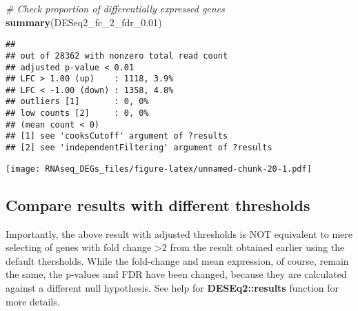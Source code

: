 \documentclass[]{book}
\newenvironment{Shaded}{\begin{snugshade}}{\end{snugshade}}
\newcommand{\KeywordTok}[1]{\textcolor[rgb]{0.13,0.29,0.53}{\textbf{#1}}}
\newcommand{\DataTypeTok}[1]{\textcolor[rgb]{0.13,0.29,0.53}{#1}}
\newcommand{\DecValTok}[1]{\textcolor[rgb]{0.00,0.00,0.81}{#1}}
\newcommand{\FloatTok}[1]{\textcolor[rgb]{0.00,0.00,0.81}{#1}}
\newcommand{\StringTok}[1]{\textcolor[rgb]{0.31,0.60,0.02}{#1}}
\newcommand{\CommentTok}[1]{\textcolor[rgb]{0.56,0.35,0.01}{\textit{#1}}}
\newcommand{\OperatorTok}[1]{\textcolor[rgb]{0.81,0.36,0.00}{\textbf{#1}}}
\newcommand{\NormalTok}[1]{#1}
\begin{document}
\begin{Shaded}
\begin{Highlighting}[]
\CommentTok{# Check proportion of differentially expressed genes}
\KeywordTok{summary}\NormalTok{(DESeq2_fc_2_fdr_}\FloatTok{0.01}\NormalTok{)}
\end{Highlighting}
\end{Shaded}

\begin{verbatim}
## 
## out of 28362 with nonzero total read count
## adjusted p-value < 0.01
## LFC > 1.00 (up)    : 1118, 3.9%
## LFC < -1.00 (down) : 1358, 4.8%
## outliers [1]       : 0, 0%
## low counts [2]     : 0, 0%
## (mean count < 0)
## [1] see 'cooksCutoff' argument of ?results
## [2] see 'independentFiltering' argument of ?results
\end{verbatim}

\begin{Shaded}
\end{Shaded}

\texttt{[image: RNAseq\_DEGs\_files/figure-latex/unnamed-chunk-20-1.pdf]}

\subsection{Compare results with different
thresholds}\label{compare-results-with-different-thresholds}

Importantly, the above result with adjusted thresholds is NOT equivalent
to mere selecting of genes with fold change \textgreater{}2 from the
result obtained earlier using the default thersholds. While the
fold-change and mean expression, of course, remain the same, the
p-values and FDR have been changed, because they are calculated against
a different null hypothesis. See help for \textbf{DESEq2::results}
function for more details.

\begin{Shaded}
\end{Shaded}
\end{document}
